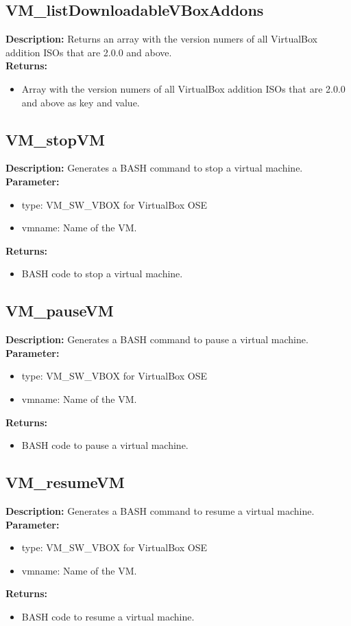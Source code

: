 \subsection{VM\_listDownloadableVBoxAddons}
\textbf{Description:} Returns an array with the version numers of all VirtualBox addition ISOs that are 2.0.0 and above.\\
\textbf{Returns:}
\begin{itemize}
\item Array with the version numers of all VirtualBox addition ISOs that are 2.0.0 and above as key and value.
\end{itemize}

\subsection{VM\_stopVM}
\textbf{Description:} Generates a BASH command to stop a virtual machine.\\
\textbf{Parameter:}
\begin{itemize}
\item type: VM\_SW\_VBOX for VirtualBox OSE
\item vmname: Name of the VM.
\end{itemize}
\textbf{Returns:}
\begin{itemize}
\item BASH code to stop a virtual machine.
\end{itemize}

\subsection{VM\_pauseVM}
\textbf{Description:} Generates a BASH command to pause a virtual machine.\\
\textbf{Parameter:}
\begin{itemize}
\item type: VM\_SW\_VBOX for VirtualBox OSE
\item vmname: Name of the VM.
\end{itemize}
\textbf{Returns:}
\begin{itemize}
\item BASH code to pause a virtual machine.
\end{itemize}

\subsection{VM\_resumeVM}
\textbf{Description:} Generates a BASH command to resume a virtual machine.\\
\textbf{Parameter:}
\begin{itemize}
\item type: VM\_SW\_VBOX for VirtualBox OSE
\item vmname: Name of the VM.
\end{itemize}
\textbf{Returns:}
\begin{itemize}
\item BASH code to resume a virtual machine.
\end{itemize}

